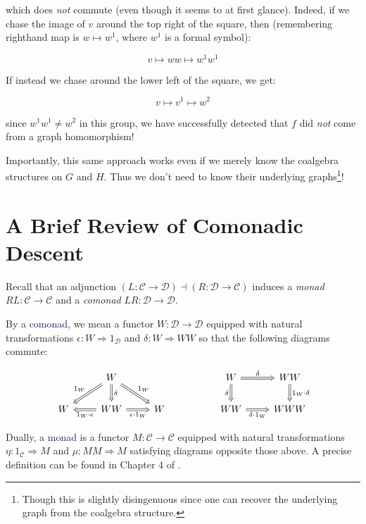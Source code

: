 \documentclass[12pt]{article}
\theoremstyle{definition}
\theoremstyle{theorem}
\newcommand*{\catVarFont}[1]{\mathcal{#1}}
\newcommand{\catC}{\catVarFont{C}}
\newcommand{\catD}{\catVarFont{D}}
\newcommand*{\important}[1]{\textcolor{MidnightBlue}{#1}}
\begin{document}
which does \emph{not} commute (even though it seems to at first glance). 
Indeed, if we chase the image of $v$ around the top right of the square, then
(remembering righthand map is $w \mapsto w^1$, where $w^1$ is a formal symbol):

\[ v \mapsto ww \mapsto w^1 w^1 \]

If instead we chase around the lower left of the square, we get:

\[ v \mapsto v^1 \mapsto w^2 \]

since $w^1 w^1 \neq w^2$ in this group, we have successfully detected that 
$f$ did \emph{not} come from a graph homomorphism!

Importantly, this same approach works even if we merely know the 
coalgebra structures on $G$ and $H$. Thus we don't need to know their
underlying graphs\footnote{Though this is slightly disingenuous since one 
can recover the underlying graph from the coalgebra structure.}! 

\section{A Brief Review of Comonadic Descent}
\label{review}

Recall that an adjunction
$(L : \catC \to \catD) \dashv (R : \catD \to \catC)$
induces a \emph{monad} $RL : \catC \to \catC$ and a \emph{comonad}
$LR : \catD \to \catD$.

By a \important{comonad}, we mean a functor $W : \catD \to \catD$ equipped with natural
transformations $\epsilon : W \Rightarrow 1_\catD$ and $\delta : W \Rightarrow WW$
so that the following diagrams commute:

\[
    \begin{tikzcd}
    & W &&& W & WW \\
    W & WW & W && WW & WWW
    \arrow["{1_W \cdot \epsilon}", Rightarrow, from=2-2, to=2-1]
    \arrow["{\epsilon \cdot 1_W}"', Rightarrow, from=2-2, to=2-3]
    \arrow["\delta", Rightarrow, from=1-2, to=2-2]
    \arrow["{1_W}"', Rightarrow, from=1-2, to=2-1]
    \arrow["{1_W}", Rightarrow, from=1-2, to=2-3]
    \arrow["\delta"', Rightarrow, from=1-5, to=2-5]
    \arrow["\delta", Rightarrow, from=1-5, to=1-6]
    \arrow["{\delta \cdot 1_W}"', Rightarrow, from=2-5, to=2-6]
    \arrow["{1_W \cdot \delta}", Rightarrow, from=1-6, to=2-6]
    \end{tikzcd}
\]

Dually, a \important{monad} is a functor $M : \catC \to \catC$ equipped with 
natural transformations $\eta : 1_\catC \Rightarrow M$ and 
$\mu : MM \Rightarrow M$ satisfying diagrams opposite those above. A precise
definition can be found in Chapter $4$ of \cite{borceuxCategoriesStructures1994}.
\end{document}
